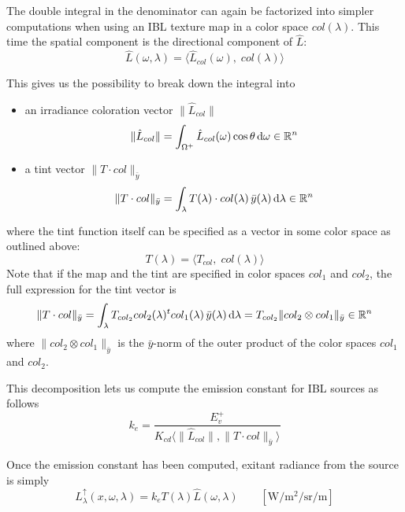 The double integral in the denominator can again be factorized into simpler
computations when using an \gls{IBL} texture map in a color space $col(\lambda)$.
This time the spatial component is the directional component of $\hat{L}$:
\begin{equation}
\hat{L}(\omega, \lambda) = \big\langle \hat{L}_{col}(\omega),\; col(\lambda) \big\rangle
\end{equation}

This gives us the possibility to break down the integral into
\begin{itemize}
\item an irradiance coloration vector $\|\hat{L}_{col}\|$
\begin{equation}
\|\hat{L}_{col}\| = \int_{\Omega^+} \hat{L}_{col}(\omega)\cos\theta \mathop{}\!\mathrm{d}\omega \in \mathbb{R}^n
\end{equation}
\item a tint vector $\|T \cdot col\|_{\bar y}$
\begin{equation}
\|T \cdot col\|_{\bar y} = \int_\lambda T(\lambda)\cdot col(\lambda)\,\bar y(\lambda) \mathop{}\!\mathrm{d}\lambda \in \mathbb{R}^n
\end{equation}
\end{itemize}
where the tint function itself can be specified as a vector in some color space
as outlined above:
\begin{equation}
T(\lambda) = \langle T_{col},\; col(\lambda)\rangle
\end{equation}
Note that if the map and the tint are specified in color spaces $col_1$ and
$col_2$, the full expression for the tint vector is
\begin{equation}
\|T \cdot col\|_{\bar y} = \int_\lambda T_{col_2}col_2(\lambda)^t col_1(\lambda)\,\bar y(\lambda) \mathop{}\!\mathrm{d}\lambda
 = T_{col_2} \|col_2 \otimes col_1\|_{\bar y}
 \in \mathbb{R}^n
\end{equation}
where $\|col_2 \otimes col_1\|_{\bar y}$ is the $\bar y$-norm of the outer
product of the color spaces $col_1$ and $col_2$.

This decomposition lets us compute the emission constant for \gls{IBL} sources
as follows
\begin{equation}
k_e = \frac{E^+_v} {K_{cd} \langle \|\hat{L}_{col}\|, \|T \cdot col\|_{\bar y}
\rangle}
\end{equation}

Once the emission constant has been computed, exitant radiance from the source
is simply
\begin{equation}
L^\uparrow_{\lambda}(x, \omega, \lambda) = k_e  T(\lambda)
\hat{L}(\omega,\lambda)
\qquad \left[\unit{\watt\per\square\meter\per\steradian\per\meter}\right]
\end{equation}

